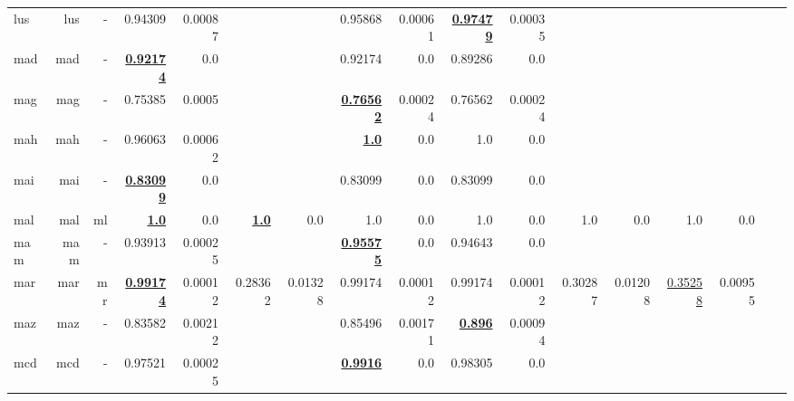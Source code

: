 \documentclass[11pt]{article}
\begin{document}
\begin{table*}[h]
{\begin{tabular}{lrrrrrrrrrrrrrrrr}
lus         & lus         & -         & 0.94309         & 0.00087         &          &          & 0.95868         & 0.00061         & \textbf{\underline{0.97479}}         & 0.00035         &          &          &          &          \\
mad         & mad         & -         & \textbf{\underline{0.92174}}         & 0.0         &          &          & 0.92174         & 0.0         & 0.89286         & 0.0         &          &          &          &          \\
mag         & mag         & -         & 0.75385         & 0.0005         &          &          & \textbf{\underline{0.76562}}         & 0.00024         & 0.76562         & 0.00024         &          &          &          &          \\
mah         & mah         & -         & 0.96063         & 0.00062         &          &          & \textbf{\underline{1.0}}         & 0.0         & 1.0         & 0.0         &          &          &          &          \\
mai         & mai         & -         & \textbf{\underline{0.83099}}         & 0.0         &          &          & 0.83099         & 0.0         & 0.83099         & 0.0         &          &          &          &          \\
mal         & mal         & ml         & \textbf{\underline{1.0}}         & 0.0         & \textbf{\underline{1.0}}         & 0.0         & 1.0         & 0.0         & 1.0         & 0.0         & 1.0         & 0.0         & 1.0         & 0.0         \\
mam         & mam         & -         & 0.93913         & 0.00025         &          &          & \textbf{\underline{0.95575}}         & 0.0         & 0.94643         & 0.0         &          &          &          &          \\
mar         & mar         & mr         & \textbf{\underline{0.99174}}         & 0.00012         & 0.28362         & 0.01328         & 0.99174         & 0.00012         & 0.99174         & 0.00012         & 0.30287         & 0.01208         & \underline{0.35258}         & 0.00955         \\
maz         & maz         & -         & 0.83582         & 0.00212         &          &          & 0.85496         & 0.00171         & \textbf{\underline{0.896}}         & 0.00094         &          &          &          &          \\
mcd         & mcd         & -         & 0.97521         & 0.00025         &          &          & \textbf{\underline{0.9916}}         & 0.0         & 0.98305         & 0.0         &          &          &          &          \\

\end{tabular}}
\end{table*}
\end{document}

